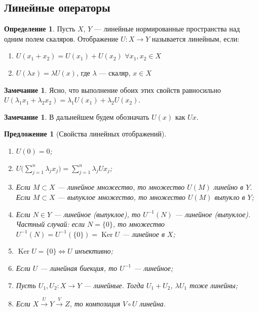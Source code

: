 \documentclass[11pt,openany,a4paper]{scrartcl}
\theoremstyle{plain}
\newtheorem{proposition}[theorem]{Предложение}
\theoremstyle{definition}
\newtheorem{definition}[theorem]{Определение}
\newtheorem{remark}[theorem]{Замечание}
\newcommand{\overto}[1]{\xrightarrow{#1}}
\DeclareMathOperator{\Ker}{Ker}
\begin{document}
\subsection{Линейные операторы}
\begin{definition}
    Пусть $X$, $Y$ — линейные нормированные пространства над одним полем скаляров.
    Отображение $U: X \to Y$ называется линейным, если:
    \begin{enumerate}
        \item $U(x_1+x_2) = U(x_1) + U(x_2)$ $\forall x_1, x_2 \in X$
        \item $U(\lambda x) = \lambda U(x)$, где $\lambda$ — скаляр, $x \in X$
    \end{enumerate}
\end{definition}
\begin{remark}
    Ясно, что выполнение обоих этих свойств равносильно
    $U(\lambda_1x_1 + \lambda_2x_2) = \lambda_1U(x_1) + \lambda_2U(x_2)$.
\end{remark}
\begin{remark}
    В дальнейшем будем обозначать $U(x)$ как $Ux$.
\end{remark}
\begin{proposition}[Свойства линейных отображений]
\mbox{}
    \begin{enumerate}
        \item $U(0) = 0$;
        \item $U\bigg(\sum\limits_{j=1}^n \lambda_j x_j\bigg) = \sum\limits_{j=1}^n
        \lambda_j Ux_j$;
        \item\label{image_linearity} Если $M \subset X$ — линейное множество,
        то множество
        $U(M)$ линейно в $Y$. Если $M \subset X$ — выпуклое множество,
        то множество $U(M)$ выпукло в $Y$;
        \item\label{preimage_linearity} Если $N \in Y$ — линейное (выпуклое),
        то $U^{-1}(N)$ — линейное (выпуклое). Частный случай: если $N = \{0\}$, то множество
        $U^{-1}(N) = U^{-1}(\{0\}) = \Ker U$ — линейное в $X$;
        \item $\Ker U = \{0\} \iff U$ инъективно;
        \item\label{inverse_linearity} Если $U$ — линейная биекция, то
        $U^{-1}$ — линейное;
        \item Пусть $U_1, U_2: X \to Y$ — линейные. Тогда $U_1 + U_2$,
        $\lambda U_1$ тоже линейны;
        \item Если $X \overto{U} Y \overto{V} Z$, то композиция $V\circ U$
        линейна.
    \end{enumerate}
\end{proposition}
\end{document}
